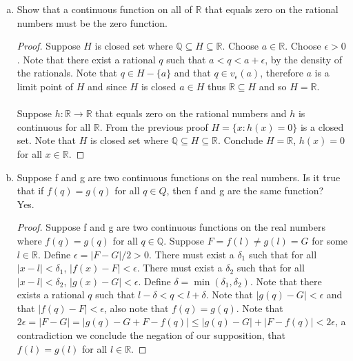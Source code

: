 \documentclass[12pt]{article}
\theoremstyle{homework}
\begin{document}
\begin{enumerate}[a)]
\item
Show that a continuous function on all of $\mathbb{R}$ that equals zero on the rational numbers must be the zero function.
\begin{proof}
Suppose $H$ is closed set where $\mathbb{Q}\subseteq H \subseteq \mathbb{R}$.  Choose $a\in\mathbb{R}$.  Choose $\epsilon>0$.  Note that there exist a rational $q$ such that $a<q<a+\epsilon$, by the density of the rationals.  Note that $q\in H-\{a\}$ and that $q\in v_\epsilon(a)$, therefore $a$ is a limit point of $H$ and since $H$ is closed $a\in H$ thus $\mathbb{R}\subseteq H$ and so $H=\mathbb{R}$.\\\\
Suppose $h:\mathbb{R}\rightarrow\mathbb{R}$ that equals zero on the rational numbers and $h$ is continuous for all $\mathbb{R}$.  From the previous proof $H=\{x:h(x)=0\}$ is a closed set.  Note that $H$ is closed set where $\mathbb{Q}\subseteq H \subseteq \mathbb{R}$.  Conclude $H=\mathbb{R}$, $h(x)=0$ for all $x\in\mathbb{R}$.
\end{proof}
\item
Suppose f and g are two continuous functions on the real numbers. Is it true that if $f(q)=g(q)$ for all $q \in Q$, then f and g are the same function?\\
Yes.\\
\begin{proof}
Suppose f and g are two continuous functions on the real numbers where $f(q)=g(q)$ for all $q\in\mathbb{Q}$.  Suppose $F=f(l)\neq g(l)=G$ for some $l\in\mathbb{R}$.  Define $\epsilon=|F-G|/2>0$.  There must exist a $\delta_1$ such that for all $|x-l|<\delta_1$, $|f(x)-F|<\epsilon$.  There must exist a $\delta_2$ such that for all $|x-l|<\delta_2$, $|g(x)-G|<\epsilon$.  Define $\delta=\min(\delta_1,\delta_2)$.  Note that there exists a rational $q$ such that $l-\delta<q<l+\delta$.  Note that $|g(q)-G|<\epsilon$ and that $|f(q)-F|<\epsilon$, also note that $f(q)=g(q)$.  Note that $2\epsilon=|F-G|=|g(q)-G+F-f(q)|\leq |g(q)-G|+|F-f(q)|<2\epsilon$, a contradiction we conclude the negation of our supposition, that $f(l)=g(l)$ for all $l\in\mathbb{R}$.
\end{proof}
\end{enumerate}
\end{document}
